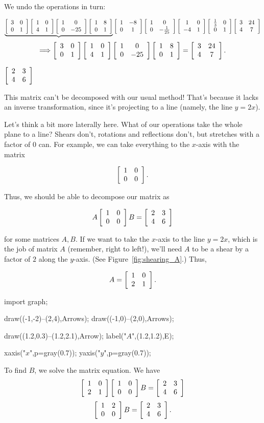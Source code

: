 \documentclass[../key.tex]{subfiles}
\begin{document}
We undo the operations in turn:

$$\underbrace{\twomat{3}{0}{0}{1}\twomat{1}{0}{4}{1}\twomat{1}{0}{0}{-25}\twomat{1}{8}{0}{1}}\twomat{1}{-8}{0}{1}\twomat{1}{0}{0}{-\frac{1}{25}}\twomat{1}{0}{-4}{1}\twomat{\frac{1}{3}}{0}{0}{1}\twomat{3}{24}{4}{7}$$
$$\Longrightarrow \twomat{3}{0}{0}{1}\twomat{1}{0}{4}{1}\twomat{1}{0}{0}{-25}\twomat{1}{8}{0}{1} = \twomat{3}{24}{4}{7}.$$

\begin{inner_problem}
\item $\twomat{2}{3}{4}{6}$
\end{inner_problem}

This matrix can't be decomposed with our usual method! That's because it lacks an inverse transformation, since it's projecting to a line (namely, the line $y=2x$).

Let's think a bit more laterally here. What of our operations take the whole plane to a line? Shears don't, rotations and reflections don't, but stretches with a factor of $0$ can. For example, we can take everything to the $x$-axis with the matrix

$$\twomat{1}{0}{0}{0}.$$

Thus, we should be able to decompose our matrix as

$$A\twomat{1}{0}{0}{0}B=\twomat{2}{3}{4}{6}$$

for some matrices $A,B$. If we want to take the $x$-axis to the line $y=2x$, which is the job of matrix $A$ (remember, right to left!), we'll need $A$ to be a shear by a factor of $2$ along the $y$-axis. (See Figure~\ref{fig:shearing_A}.) Thus,

$$A=\twomat{1}{0}{2}{1}.$$

\begin{center}
	\begin{asy}[width=0.26\textwidth]
		import graph;

		draw((-1,-2)--(2,4),Arrows);
		draw((-1,0)--(2,0),Arrows);

		draw((1.2,0.3)--(1.2,2.1),Arrow);
		label("$A$",(1.2,1.2),E);

		xaxis("$x$",p=gray(0.7));
		yaxis("$y$",p=gray(0.7));
	\end{asy}
	\label{fig:shearing_A}
\end{center}

To find $B$, we solve the matrix equation. We have $$\twomat{1}{0}{2}{1}\twomat{1}{0}{0}{0}B=\twomat{2}{3}{4}{6}$$
$$\twomat{1}{2}{0}{0}B=\twomat{2}{3}{4}{6}.$$
\end{document}
